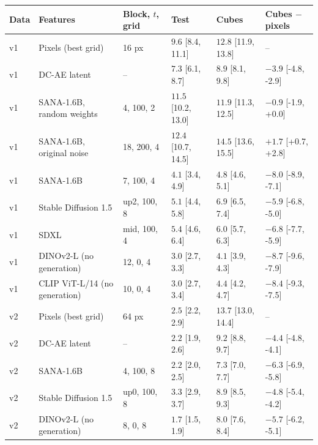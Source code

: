 \begin{tabular}{llllll}
\toprule
Data & Features & Block, $t$, grid & Test & Cubes & Cubes $-$ pixels \\
\midrule
v1 & Pixels (best grid) & 16 px & $9.6$ \scriptsize{[8.4, 11.1]} & $12.8$ \scriptsize{[11.9, 13.8]} & -- \\
v1 & DC-AE latent & -- & $7.3$ \scriptsize{[6.1, 8.7]} & $8.9$ \scriptsize{[8.1, 9.8]} & $-3.9$ \scriptsize{[-4.8, -2.9]} \\
v1 & SANA-1.6B, random weights & 4, 100, 2 & $11.5$ \scriptsize{[10.2, 13.0]} & $11.9$ \scriptsize{[11.3, 12.5]} & $-0.9$ \scriptsize{[-1.9, +0.0]} \\
v1 & SANA-1.6B, original noise & 18, 200, 4 & $12.4$ \scriptsize{[10.7, 14.5]} & $14.5$ \scriptsize{[13.6, 15.5]} & $+1.7$ \scriptsize{[+0.7, +2.8]} \\
v1 & SANA-1.6B & 7, 100, 4 & $4.1$ \scriptsize{[3.4, 4.9]} & $4.8$ \scriptsize{[4.6, 5.1]} & $-8.0$ \scriptsize{[-8.9, -7.1]} \\
v1 & Stable Diffusion 1.5 & up2, 100, 8 & $5.1$ \scriptsize{[4.4, 5.8]} & $6.9$ \scriptsize{[6.5, 7.4]} & $-5.9$ \scriptsize{[-6.8, -5.0]} \\
v1 & SDXL & mid, 100, 4 & $5.4$ \scriptsize{[4.6, 6.4]} & $6.0$ \scriptsize{[5.7, 6.3]} & $-6.8$ \scriptsize{[-7.7, -5.9]} \\
v1 & DINOv2-L (no generation) & 12, 0, 4 & $3.0$ \scriptsize{[2.7, 3.3]} & $4.1$ \scriptsize{[3.9, 4.3]} & $-8.7$ \scriptsize{[-9.6, -7.9]} \\
v1 & CLIP ViT-L/14 (no generation) & 10, 0, 4 & $3.0$ \scriptsize{[2.7, 3.4]} & $4.4$ \scriptsize{[4.2, 4.7]} & $-8.4$ \scriptsize{[-9.3, -7.5]} \\
\midrule
v2 & Pixels (best grid) & 64 px & $2.5$ \scriptsize{[2.2, 2.9]} & $13.7$ \scriptsize{[13.0, 14.4]} & -- \\
v2 & DC-AE latent & -- & $2.2$ \scriptsize{[1.9, 2.6]} & $9.2$ \scriptsize{[8.8, 9.7]} & $-4.4$ \scriptsize{[-4.8, -4.1]} \\
v2 & SANA-1.6B & 4, 100, 8 & $2.2$ \scriptsize{[2.0, 2.5]} & $7.3$ \scriptsize{[7.0, 7.7]} & $-6.3$ \scriptsize{[-6.9, -5.8]} \\
v2 & Stable Diffusion 1.5 & up0, 100, 8 & $3.3$ \scriptsize{[2.9, 3.7]} & $8.9$ \scriptsize{[8.5, 9.3]} & $-4.8$ \scriptsize{[-5.4, -4.2]} \\
v2 & DINOv2-L (no generation) & 8, 0, 8 & $1.7$ \scriptsize{[1.5, 1.9]} & $8.0$ \scriptsize{[7.6, 8.4]} & $-5.7$ \scriptsize{[-6.2, -5.1]} \\

\end{tabular}
